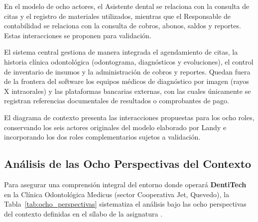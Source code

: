 En el modelo de ocho actores, el Asistente dental se relaciona con la consulta de citas y el registro de materiales utilizados, mientras que el Responsable de contabilidad se relaciona con la consulta de cobros, abonos, saldos y reportes. Estas interacciones se proponen para validación.

El sistema central gestiona de manera integrada el agendamiento de citas, la historia clínica odontológica (odontograma, diagnósticos y evoluciones), el control de inventario de insumos y la administración de cobros y reportes. Quedan fuera de la frontera del software los equipos médicos de diagnóstico por imagen (rayos X intraorales) y las plataformas bancarias externas, con las cuales únicamente se registran referencias documentales de resultados o comprobantes de pago.

El diagrama de contexto presenta las interacciones propuestas para los ocho roles, conservando los seis actores originales del modelo elaborado por Landy e incorporando los dos roles complementarios sujetos a validación.

\subsection{Análisis de las Ocho Perspectivas del Contexto}

Para asegurar una comprensión integral del entorno donde operará \textbf{DentiTech} en la Clínica Odontológica Medicus (sector Cooperativa Jet, Quevedo), la Tabla~\ref{tab:ocho_perspectivas} sistematiza el análisis bajo las ocho perspectivas del contexto definidas en el sílabo de la asignatura \cite{ireb2026}.

